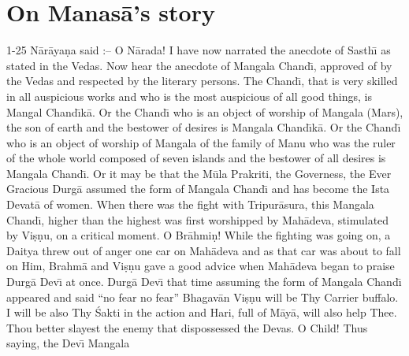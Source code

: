\chapter{On Manas\=a's story}

1-25 N\=ar\=aya\d{n}a said :-- O N\=arada! I have now narrated the anecdote of Sasth\={\i} as stated in the Vedas. Now hear the anecdote of Mangala Chand\={\i}, approved of by the Vedas and respected by the literary persons. The Chand\={\i}, that is very skilled in all auspicious works and who is the most auspicious of all good things, is Mangal Chand\={\i}k\=a. Or the Chand\={\i} who is an object of worship of Mangala (Mars), the son of earth and the bestower of desires is Mangala Chand\={\i}k\=a. Or the Chand\={\i} who is an object of worship of Mangala of the family of Manu who was the ruler of the whole world composed of seven islands and the bestower of all desires is Mangala Chand\={\i}. Or it may be that the M\=ula Prakriti, the Governess, the Ever Gracious Durg\=a assumed the form of Mangala Chand\={\i} and has become the Ista Devat\=a of women. When there was the fight with Tripur\=asura, this Mangala Chand\={\i}, higher than the highest was first worshipped by Mah\=adeva, stimulated by Vi\d{s}\d{n}u, on a critical moment. O Br\=ahmi\d{n}! While the fighting was going on, a Daitya threw out of anger one car on Mah\=adeva and as that car was about to fall on Him, Brahm\=a and Vi\d{s}\d{n}u gave a good advice when Mah\=adeva began to praise Durg\=a Dev\={\i} at once. Durg\=a Dev\={\i} that time assuming the form of Mangala Chand\={\i} appeared and said ``no fear no fear'' Bhagav\=an Vi\d{s}\d{n}u will be Thy Carrier buffalo. I will be also Thy \'Sakti in the action and Hari, full of M\=ay\=a, will also help Thee. Thou better slayest the enemy that dispossessed the Devas. O Child! Thus saying, the Dev\={\i} Mangala

